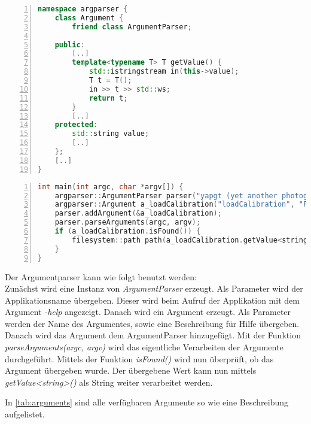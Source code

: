 \begin{lstlisting}[language=c++, numbers=left, breaklines=true, breakatwhitespace=false, label=lst:argparser_argument_friend]
namespace argparser {
    class Argument {
        friend class ArgumentParser;

    public:
        [..]
        template<typename T> T getValue() {
            std::istringstream in(this->value);
            T t = T();
            in >> t >> std::ws;
            return t;
        }
        [..]
    protected:
        std::string value;
        [..]
    };
    [..]
}
\end{lstlisting}

\begin{lstlisting}[language=c++, numbers=left, breaklines=true, breakatwhitespace=false, label=lst:argparser_example, caption=Argparser Verwendung]
int main(int argc, char *argv[]) {
    argparser::ArgumentParser parser("yapgt (yet another photogrammetry tool)");
    argparser::Argument a_loadCalibration("loadCalibration", "Filepath to load calibration from");    
    parser.addArgument(&a_loadCalibration);
    parser.parseArguments(argc, argv);
    if (a_loadCalibration.isFound()) {
        filesystem::path path(a_loadCalibration.getValue<string>());
    }
}
\end{lstlisting}

Der Argumentparser kann wie folgt benutzt werden:\\
Zunächst wird eine Instanz von \emph{ArgumentParser} erzeugt.
Als Parameter wird der Applikationsname übergeben.
Dieser wird beim Aufruf der Applikation mit dem Argument \emph{-help} angezeigt.
Danach wird ein Argument erzeugt.
Als Parameter werden der Name des Argumentes, sowie eine Beschreibung für Hilfe übergeben.
Danach wird das Argument dem ArgumentParser hinzugefügt.
Mit der Funktion \emph{parseArguments(argc, argv)} wird das eigentliche Verarbeiten der Argumente durchgeführt.
Mittels der Funktion \emph{isFound()} wird nun überprüft, ob das Argument übergeben wurde.
Der übergebene Wert kann nun mittels \emph{getValue<string>()} als String weiter verarbeitet werden.

In \autoref{tab:arguments} sind alle verfügbaren Argumente so wie eine Beschreibung aufgelistet.

